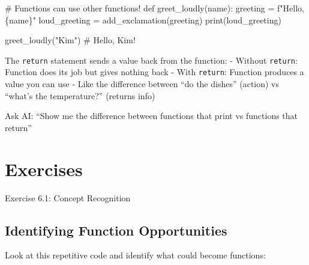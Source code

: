 \documentclass[
  letterpaper,
  DIV=11,
  numbers=noendperiod,
  oneside]{scrreprt}
\newenvironment{Shaded}{}{}
\newcommand{\BuiltInTok}[1]{\textcolor[rgb]{0.84,0.23,0.29}{#1}}
\newcommand{\CommentTok}[1]{\textcolor[rgb]{0.42,0.45,0.49}{#1}}
\newcommand{\KeywordTok}[1]{\textcolor[rgb]{0.84,0.23,0.29}{#1}}
\newcommand{\NormalTok}[1]{\textcolor[rgb]{0.14,0.16,0.18}{#1}}
\newcommand{\OperatorTok}[1]{\textcolor[rgb]{0.14,0.16,0.18}{#1}}
\newcommand{\SpecialCharTok}[1]{\textcolor[rgb]{0.00,0.36,0.77}{#1}}
\newcommand{\SpecialStringTok}[1]{\textcolor[rgb]{0.01,0.18,0.38}{#1}}
\newcommand{\StringTok}[1]{\textcolor[rgb]{0.01,0.18,0.38}{#1}}
\begin{document}
\begin{Shaded}
\begin{Highlighting}[]
\CommentTok{\# Functions can use other functions!}
\KeywordTok{def}\NormalTok{ greet\_loudly(name):}
\NormalTok{    greeting }\OperatorTok{=} \SpecialStringTok{f"Hello, }\SpecialCharTok{\{}\NormalTok{name}\SpecialCharTok{\}}\SpecialStringTok{"}
\NormalTok{    loud\_greeting }\OperatorTok{=}\NormalTok{ add\_exclamation(greeting)}
    \BuiltInTok{print}\NormalTok{(loud\_greeting)}

\NormalTok{greet\_loudly(}\StringTok{"Kim"}\NormalTok{)  }\CommentTok{\# Hello, Kim!}
\end{Highlighting}
\end{Shaded}

\begin{tcolorbox}[enhanced jigsaw, opacityback=0, colback=white, colframe=quarto-callout-note-color-frame, breakable, titlerule=0mm, coltitle=black, rightrule=.15mm, colbacktitle=quarto-callout-note-color!10!white, left=2mm, bottomtitle=1mm, bottomrule=.15mm, title=\textcolor{quarto-callout-note-color}{\faInfo}\hspace{0.5em}{Expression Explorer: Return Values}, opacitybacktitle=0.6, toptitle=1mm, leftrule=.75mm, arc=.35mm, toprule=.15mm]

The \texttt{return} statement sends a value back from the function: -
Without \texttt{return}: Function does its job but gives nothing back -
With \texttt{return}: Function produces a value you can use - Like the
difference between ``do the dishes'' (action) vs ``what's the
temperature?'' (returns info)

Ask AI: ``Show me the difference between functions that print vs
functions that return''

\end{tcolorbox}

\section{Exercises}\label{exercises-6}

Exercise 6.1: Concept Recognition

\subsection{Identifying Function
Opportunities}\label{identifying-function-opportunities}

Look at this repetitive code and identify what could become functions:
\end{document}

